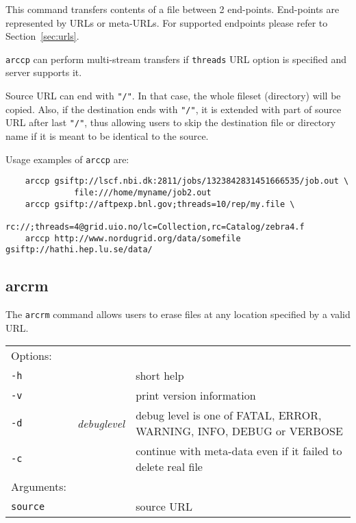 This command transfers contents of a file between 2 end-points.
End-points are represented by URLs or meta-URLs. For supported
endpoints please refer to Section~\ref{sec:urls}.

\texttt{arccp} can perform multi-stream transfers if \texttt{threads}
URL option is specified and server supports it.

Source URL can end with \verb#"/"#. In that case, the whole fileset
(directory) will be copied. Also, if the destination ends with
\verb#"/"#, it is extended with part of source URL after last
\verb#"/"#, thus allowing users to skip the destination file or
directory name if it is meant to be identical to the source.

Usage examples of \texttt{arccp} are:

\begin{verbatim}
    arccp gsiftp://lscf.nbi.dk:2811/jobs/1323842831451666535/job.out \
              file:///home/myname/job2.out
    arccp gsiftp://aftpexp.bnl.gov;threads=10/rep/my.file \
              rc://;threads=4@grid.uio.no/lc=Collection,rc=Catalog/zebra4.f
    arccp http://www.nordugrid.org/data/somefile gsiftp://hathi.hep.lu.se/data/
\end{verbatim}

\subsection{arcrm}\label{sec:arcrm}

The \texttt{arcrm} 
command allows users to erase files at any location specified by a
valid URL.
\hspace*{0.5cm}
\begin{shaded}
\end{shaded}
\begin{longtable}{llp{8cm}}
    Options:&&\\
    \texttt{-h} && short help\\
    \texttt{-v} && print version information\\
    \texttt{-d} & \textit{debuglevel} &debug level is one of  FATAL, ERROR, WARNING, INFO, DEBUG or VERBOSE\\
    \texttt{-c} & &continue with meta-data even if it failed to delete real file\\
    Arguments:&&\\
    \texttt{source} && source URL\\
\end{longtable}

